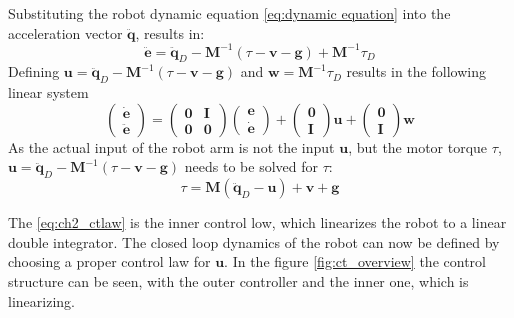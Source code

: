 Substituting the robot dynamic equation \eqref{eq:dynamic equation} into the acceleration vector $\ddot{\mathbf{q}}$, results in:
\begin{equation*}
\ddot{\mathbf{e}} = \ddot{\mathbf{q}}_D - \mathbf{M}^{-1}\left(\tau - \mathbf{v} - \mathbf{g}\right) + \mathbf{M}^{-1}\tau_D
\end{equation*}
Defining $\mathbf{u} = \ddot{\mathbf{q}}_D - \mathbf{M}^{-1}\left(\tau - \mathbf{v} - \mathbf{g}\right)$ and $\mathbf{w} = \mathbf{M}^{-1}\tau_D$ results in the following linear system
\begin{equation*}
\left(\begin{array}{c}
\dot{\mathbf{e}} \\ \ddot{\mathbf{e}}
\end{array}\right) = \left(\begin{array}{cc}
\mathbf{0} & \mathbf{I} \\
\mathbf{0} & \mathbf{0} 
\end{array}\right) \left(\begin{array}{c}
\mathbf{e} \\ \dot{\mathbf{e}}
\end{array}\right) + \left(\begin{array}{c}
\mathbf{0} \\ \mathbf{I}
\end{array}\right) \mathbf{u} + \left(\begin{array}{c}
\mathbf{0} \\ \mathbf{I}
\end{array}\right) \mathbf{w}
\end{equation*}
As the actual input of the robot arm is not the input $\mathbf{u}$, but the motor torque $\tau$, $\mathbf{u} = \ddot{\mathbf{q}}_D - \mathbf{M}^{-1}\left(\tau - \mathbf{v} - \mathbf{g}\right)$ needs to be solved for $\tau$:
\begin{equation}
\tau = \mathbf{M}(\ddot{\mathbf{q}}_D - \mathbf{u}) + \mathbf{v} + \mathbf{g}
\label{eq:ch2_ctlaw}
\end{equation}

The \eqref{eq:ch2_ctlaw} is the inner control low, which linearizes the robot to a linear double integrator. The closed loop dynamics of the robot can now be defined by choosing a proper control law for $\mathbf{u}$. In the figure \ref{fig:ct_overview} the control structure can be seen, with the outer controller and the inner one, which is linearizing.

